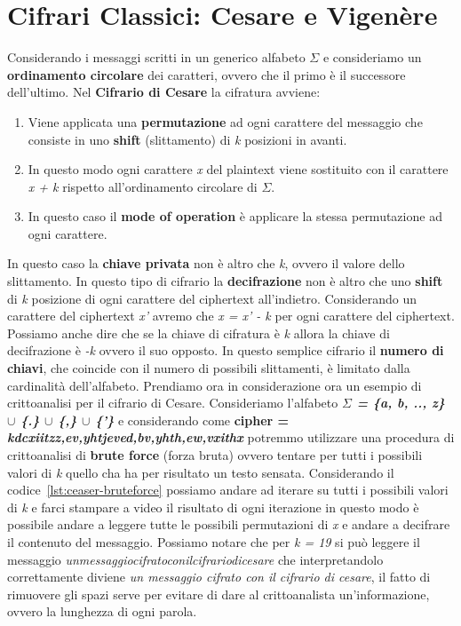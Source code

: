 \section{Cifrari Classici: Cesare e Vigenère}
Considerando i messaggi scritti in un generico alfabeto $\Sigma$ e consideriamo un \textbf{ordinamento circolare} dei caratteri, ovvero che il primo è il successore dell'ultimo. Nel \textbf{Cifrario di Cesare} la cifratura avviene:
\begin{enumerate}
    \item Viene applicata una \textbf{permutazione} ad ogni carattere del messaggio che consiste in uno \textbf{shift} (slittamento) di \textit{k} posizioni in avanti.
    \item In questo modo ogni carattere \textit{x} del plaintext viene sostituito con il carattere \textit{x + k} rispetto all'ordinamento circolare di $\Sigma$.
    \item In questo caso il \textbf{mode of operation} è applicare la stessa permutazione ad ogni carattere.
\end{enumerate}
In questo caso la \textbf{chiave privata} non è altro che \textit{k}, ovvero il valore dello slittamento. In questo tipo di cifrario la \textbf{decifrazione} non è altro che uno \textbf{shift} di \textit{k} posizione di ogni carattere del ciphertext all'indietro. Considerando un carattere del ciphertext \textit{x'} avremo che \textit{x = x' - k} per ogni carattere del ciphertext. Possiamo anche dire che se la chiave di cifratura è \textit{k} allora la chiave di decifrazione è \textit{-k} ovvero il suo opposto. In questo semplice cifrario il \textbf{numero di chiavi}, che coincide con il numero di possibili slittamenti, è limitato dalla cardinalità dell'alfabeto.
\newline
Prendiamo ora in considerazione ora un esempio di crittoanalisi per il cifrario di Cesare. Consideriamo l'alfabeto \textbf{\textit{$\Sigma$ = \{a, b, .., z\} $\cup$ \{.\} $\cup$ \{,\} $\cup$ \{'\}}} e considerando come \textbf{cipher = \textit{kdcxiitzz,ev,yhtjeved,bv,yhth,ew,vxithx}} potremmo utilizzare una procedura di crittoanalisi di \textbf{brute force} (forza bruta) ovvero tentare per tutti i possibili valori di \textit{k} quello cha ha per risultato un testo sensata. Considerando il codice~\ref{lst:ceaser-bruteforce} possiamo andare ad iterare su tutti i possibili valori di \textit{k} e farci stampare a video il risultato di ogni iterazione in questo modo è possibile andare a leggere tutte le possibili permutazioni di \textit{x} e andare a decifrare il contenuto del messaggio. 
\newline
Possiamo notare che per \textit{k = 19} si può leggere il messaggio \textit{unmessaggiocifratoconilcifrariodicesare} che interpretandolo correttamente diviene \textit{un messaggio cifrato con il cifrario di cesare}, il fatto di rimuovere gli spazi serve per evitare di dare al crittoanalista un'informazione, ovvero la lunghezza di ogni parola.

